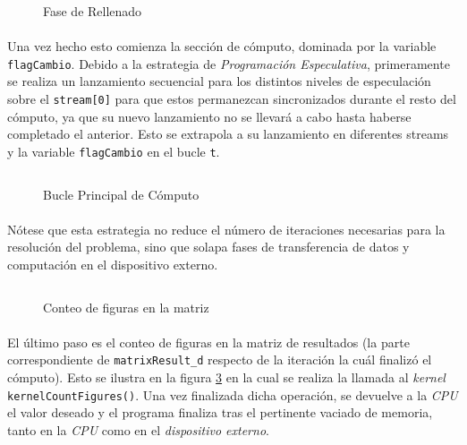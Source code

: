 \documentclass[10pt, a4paper,spanish]{article}
\begin{document}
		\begin{figure}[h]
			\centering
			\inputminted{cuda}{./code/fill.cu}
			\caption{Fase de Rellenado}
			\label{code:fill}
		\end{figure}

		\paragraph{}
		Una vez hecho esto comienza la sección de cómputo, dominada por la variable \texttt{flagCambio}. Debido a la estrategia de \emph{Programación Especulativa}, primeramente se realiza un lanzamiento secuencial para los distintos niveles de especulación sobre el \texttt{stream[0]} para que estos permanezcan sincronizados durante el resto del cómputo, ya que su nuevo lanzamiento no se llevará a cabo hasta haberse completado el anterior. Esto se extrapola a su lanzamiento en diferentes streams y la variable \texttt{flagCambio} en el bucle \texttt{t}.

		\begin{figure}[h]
			\centering
			\inputminted{cuda}{./code/compu.cu}
			\caption{Bucle Principal de Cómputo}
			\label{code:compu}
		\end{figure}

		\paragraph{}
		Nótese que esta estrategia no reduce el número de iteraciones necesarias para la resolución del problema, sino que solapa fases de transferencia de datos y computación en el dispositivo externo.

		\begin{figure}[h]
			\centering
			\inputminted{cuda}{./code/count.cu}
			\caption{Conteo de figuras en la matriz}
			\label{code:count}
		\end{figure}

		\paragraph{}
		El último paso es el conteo de figuras en la matriz de resultados (la parte correspondiente de \texttt{matrixResult\_d} respecto de la iteración la cuál finalizó el cómputo). Esto se ilustra en la figura \ref{code:count} en la cual se realiza la llamada al \emph{kernel} \texttt{kernelCountFigures()}. Una vez finalizada dicha operación, se devuelve a la \emph{CPU} el valor deseado y el programa finaliza tras el pertinente vaciado de memoria, tanto en la \emph{CPU} como en el \emph{dispositivo externo}.
\end{document}
